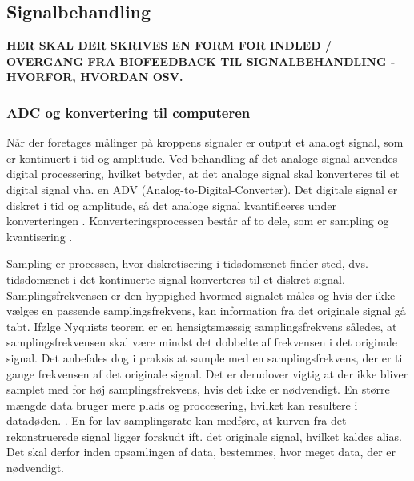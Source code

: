 \subsection{Signalbehandling}
\textbf{HER SKAL DER SKRIVES EN FORM FOR INDLED / OVERGANG FRA BIOFEEDBACK TIL SIGNALBEHANDLING - HVORFOR, HVORDAN OSV.}

\subsubsection{ADC og konvertering til computeren}
Når der foretages målinger på kroppens signaler er output et analogt signal, som er kontinuert i tid og amplitude. Ved behandling af det analoge signal anvendes digital processering, hvilket betyder, at det analoge signal skal konverteres til et digital signal vha. en ADV (Analog-to-Digital-Converter). Det digitale signal er diskret i tid og amplitude, så det analoge signal kvantificeres under konverteringen \cite{Webster2009}. Konverteringsprocessen består af to dele, som er sampling og kvantisering \cite{Zouridakis2003}.  

Sampling er processen, hvor diskretisering i tidsdomænet finder sted, dvs. tidsdomænet i det kontinuerte signal konverteres til et diskret signal. Samplingsfrekvensen er den hyppighed hvormed signalet måles og hvis der ikke vælges en passende samplingsfrekvens, kan information fra det originale signal gå tabt. Ifølge Nyquists teorem er en hensigtsmæssig samplingsfrekvens således, at samplingsfrekvensen skal være mindst det dobbelte af frekvensen i det originale signal. \cite{Zouridakis2003} Det anbefales dog i praksis at sample med en samplingsfrekvens, der er ti gange frekvensen af det originale signal. Det er derudover vigtig at der ikke bliver samplet med for høj samplingsfrekvens, hvis det ikke er nødvendigt. En større mængde data bruger mere plads og proccesering, hvilket kan resultere i datadøden. . En for lav samplingsrate kan medføre, at kurven fra det rekonstruerede signal ligger forskudt ift. det originale signal, hvilket kaldes alias. \cite{Zouridakis2003} Det skal derfor inden opsamlingen af data, bestemmes, hvor meget data, der er nødvendigt.

